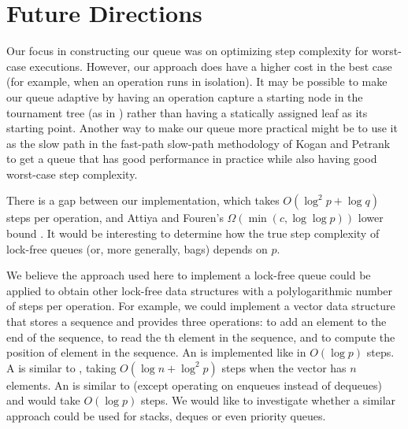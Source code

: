 
\section{Future Directions}

Our focus in constructing our queue was on optimizing step complexity for worst-case executions.
However, our approach does have a higher cost in the best case (for example, when an operation
runs in isolation).
It may be possible to make our queue adaptive by having an operation capture a starting node
in the tournament tree (as in \cite{DBLP:conf/stoc/AfekDT95}) rather than having a statically assigned leaf as its starting point.
Another way to make our queue more practical might be to use it as the slow path in the
fast-path slow-path methodology of Kogan and Petrank \cite{10.1145/2370036.2145835} to
get a queue that has good performance in practice while also having good worst-case step complexity.

There is a gap between our implementation, which takes $O(\log^2 p + \log q)$ steps per operation,
and Attiya and Fouren's $\Omega(\min(c,\log\log p))$ lower bound \cite{DBLP:conf/opodis/AttiyaF17}.
It would be interesting to determine how the true step complexity of lock-free queues (or, more generally, bags)
depends on $p$.

We believe the approach used here to implement a lock-free queue 
could be applied to obtain other lock-free
data structures with a polylogarithmic number of steps per operation.
For example, we could implement a  vector data structure that stores a sequence and
provides three operations:  to add an element  to the end of the sequence,
 to read the th element in the sequence, and
 to compute the position of element  in the sequence.
An  is implemented like  in $O(\log p)$ steps.  
A  is similar to , taking $O(\log n + \log^2p)$ steps when the vector has $n$ elements.  
An  is similar to  (except operating on enqueues instead of dequeues) and would take $O(\log p)$ steps.
We would like to investigate whether a similar approach could be used for stacks, deques or even priority queues.


